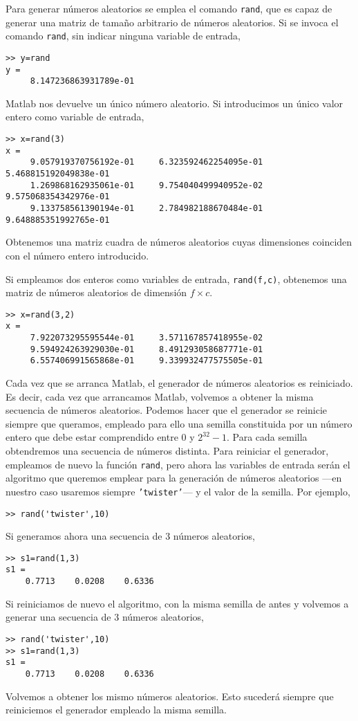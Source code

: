 Para generar números aleatorios se emplea el comando \texttt{rand}, que es capaz de generar una matriz de tamaño arbitrario de números aleatorios.  Si se invoca el comando \texttt{rand}, sin indicar ninguna variable de entrada, 
\begin{verbatim}
>> y=rand
y =
     8.147236863931789e-01
\end{verbatim}
Matlab nos devuelve un único número aleatorio. Si introducimos un único valor entero como variable de entrada,
\begin{verbatim}
>> x=rand(3)
x =
     9.057919370756192e-01     6.323592462254095e-01     5.468815192049838e-01
     1.269868162935061e-01     9.754040499940952e-02     9.575068354342976e-01
     9.133758561390194e-01     2.784982188670484e-01     9.648885351992765e-01
\end{verbatim}
Obtenemos una matriz cuadra de números aleatorios cuyas dimensiones coinciden con el número entero introducido. 

Si empleamos dos enteros como variables de entrada, \texttt{rand(f,c)}, obtenemos una matriz de números aleatorios de dimensión $f\times c$.
\begin{verbatim}
>> x=rand(3,2)
x =
     7.922073295595544e-01     3.571167857418955e-02
     9.594924263929030e-01     8.491293058687771e-01
     6.557406991565868e-01     9.339932477575505e-01
\end{verbatim}

Cada vez que se arranca Matlab, el generador de números aleatorios es reiniciado. Es decir, cada vez que arrancamos Matlab, volvemos a obtener la misma secuencia de números aleatorios. Podemos hacer que el generador se reinicie siempre que queramos, empleado para ello una semilla constituida por un número entero que debe estar comprendido entre $0$ y $2^{32}-1$. Para cada semilla obtendremos una secuencia de números distinta. Para reiniciar el generador, empleamos de nuevo la función \texttt{rand}, pero ahora las variables de entrada serán el algoritmo que queremos emplear para la generación de números aleatorios ---en nuestro caso usaremos siempre \texttt{'twister'}--- y el valor de la semilla. Por ejemplo,
\begin{verbatim}
>> rand('twister',10)
\end{verbatim}

Si generamos ahora una secuencia de 3 números aleatorios,
\begin{verbatim}
>> s1=rand(1,3)
s1 =
    0.7713    0.0208    0.6336
\end{verbatim}
Si reiniciamos de nuevo el algoritmo, con la misma semilla de antes y volvemos a generar una secuencia de 3 números aleatorios,
\begin{verbatim}
>> rand('twister',10)
>> s1=rand(1,3)
s1 =
    0.7713    0.0208    0.6336
\end{verbatim}
Volvemos a obtener los mismo números aleatorios. Esto sucederá siempre que reiniciemos el generador empleado la misma semilla.

